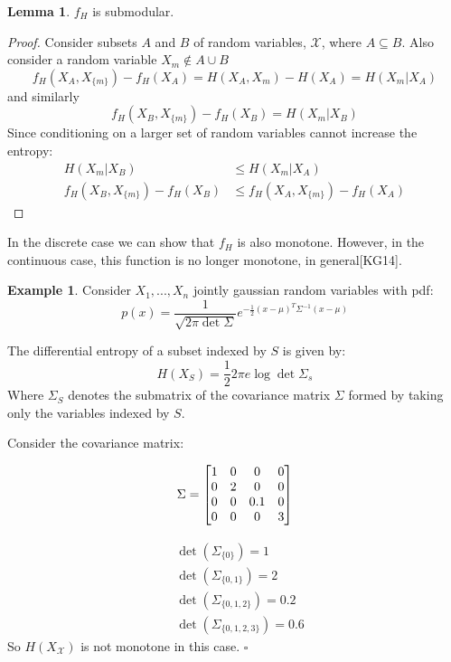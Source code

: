 \documentclass[twoside]{article}
\newcommand*{\QEDB}{\hfill\ensuremath{\square}}%
\renewcommand{\cite}[1]{[#1]}
\theoremstyle{definition}
\newtheorem{example}[theorem]{Example}
\newtheorem{lemma}[theorem]{Lemma}
\newtheorem{note}[theorem]{Note}
\begin{document}
\begin{lemma}
$f_H$ is submodular.
\end{lemma}

\begin{proof}
  Consider subsets $A$ and $B$ of random variables,
  $\mathcal{X}$, where $A \subseteq B$. Also consider a random
  variable $X_m \notin A \cup B$
  $$f_H(X_A , X_{\{m\}}) - f_H(X_A) = H(X_A, X_m) - H(X_A) = H(X_m | X_A)$$
  \centering and similarly
  $$f_H(X_B , X_{\{m\}}) - f_H(X_B) = H(X_m | X_B)$$
  Since conditioning on a larger set of random variables cannot
  increase the entropy:
  \begin{align*}
    H(X_m | X_B) & \leq H(X_m | X_A) \\
    f_H(X_B , X_{\{m\}}) - f_H(X_B) & \leq f_H(X_A , X_{\{m\}}) - f_H(X_A)
  \end{align*}
\end{proof}


In the discrete case we can show that $f_H$ is also monotone. However,
in the continuous case, this function is no longer
monotone, in general\cite{KG14}.

\begin{example}
  Consider $X_1, ..., X_n$ jointly gaussian random variables with pdf:
  $$p(x) = \frac{1}{\sqrt{2\pi \det \Sigma}} e^{-\frac{1}{2}(x-\mu)^T
    \Sigma^{-1} (x-\mu)}$$

  The differential entropy of a subset indexed by $S$ is given by:
  $$H(X_S) = \frac{1}{2} 2 \pi e\log \det \Sigma_s$$
  Where $\Sigma_S$ denotes the submatrix of the covariance matrix
  $\Sigma$ formed by taking only the variables indexed by $S$.

  Consider the covariance matrix:

  \begin{align}
    \Sigma =
    \begin{bmatrix}
               1 & 0 & 0 & 0 \\
               0 & 2 & 0 & 0 \\
               0 & 0 & 0.1 & 0 \\
               0 & 0 & 0 & 3  \notag
             \end{bmatrix}
  \end{align}

  \begin{align*}
    & \det(\Sigma_{\{0\}}) = 1\\
    & \det(\Sigma_{\{0, 1\}}) = 2\\
    & \det(\Sigma_{\{0, 1, 2\}}) = 0.2\\
    & \det(\Sigma_{\{0, 1, 2, 3\}}) = 0.6
  \end{align*}
  So $H(X_\mathcal{X})$ is not monotone in this case.
  \QEDB
\end{example}
\end{document}
